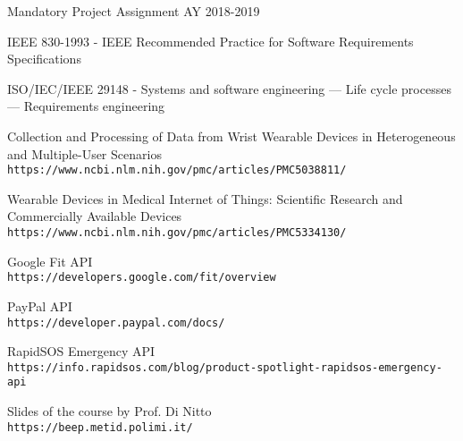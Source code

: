 \begin{thebibliography}{9}
   Mandatory Project Assignment AY 2018-2019

   IEEE 830-1993 - IEEE Recommended Practice for Software Requirements Specifications

   ISO/IEC/IEEE 29148 - Systems and software engineering — Life cycle processes — Requirements engineering

   Collection and Processing of Data from Wrist Wearable Devices in Heterogeneous and Multiple-User Scenarios\\
  \texttt{https://www.ncbi.nlm.nih.gov/pmc/articles/PMC5038811/}

   Wearable Devices in Medical Internet of Things: Scientific Research and Commercially Available Devices\\
  \texttt{https://www.ncbi.nlm.nih.gov/pmc/articles/PMC5334130/}

   Google Fit API\\
  \texttt{https://developers.google.com/fit/overview}

   PayPal API\\
  \texttt{https://developer.paypal.com/docs/}

   RapidSOS Emergency API\\
  \texttt{https://info.rapidsos.com/blog/product-spotlight-rapidsos-emergency-api}

  Slides of the course by Prof. Di Nitto\\
  \texttt{https://beep.metid.polimi.it/}


\end{thebibliography}
